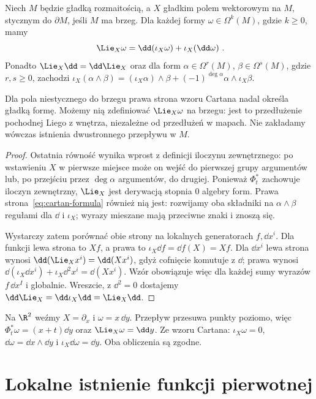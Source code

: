 \begin{twierdzenie}
\label{thm:cartan-formy}
Niech $M$ będzie gładką rozmaitością, a $X$ gładkim polem
wektorowym na $M$, stycznym do $\partial M$, jeśli
$M$ ma brzeg. Dla każdej formy $\omega\in\Omega^k(M)$,
gdzie $k\geq0$, mamy
\begin{equation}\label{eq:cartan-formula}
 {\ \Lie_X\omega=\dd(\iota_X\omega)
       +\iota_X(\dd\omega)\ }.
\end{equation}
Ponadto $\Lie_X\dd=\dd\Lie_X$ oraz dla form
$\alpha\in\Omega^r(M)$, $\beta\in\Omega^s(M)$,
gdzie $r,s\geq0$, zachodzi
$\iota_X(\alpha\wedge\beta)=
(\iota_X\alpha)\wedge\beta
+(-1)^{\deg\alpha}\alpha\wedge\iota_X\beta$.
\end{twierdzenie}
Dla pola niestycznego do brzegu prawa strona wzoru Cartana
nadal określa gładką formę. Możemy nią zdefiniować
$\Lie_X\omega$ na brzegu: jest to przedłużenie pochodnej
Liego z wnętrza, niezależne od przedłużeń w mapach.
Nie zakładamy wówczas istnienia dwustronnego przepływu w $M$.
\begin{proof}
Ostatnia równość wynika wprost z definicji iloczynu
zewnętrznego: po wstawieniu $X$ w pierwsze miejsce
może on wejść do pierwszej grupy argumentów lub,
po przejściu przez $\deg\alpha$ argumentów, do drugiej.
Ponieważ $\Phi_t^*$ zachowuje iloczyn zewnętrzny,
$\Lie_X$ jest derywacją stopnia $0$ algebry form.
Prawa strona~\eqref{eq:cartan-formula} również nią jest:
rozwijamy oba składniki na $\alpha\wedge\beta$
regułami dla $\dd$ i $\iota_X$; wyrazy mieszane mają
przeciwne znaki i znoszą się.

Wystarczy zatem porównać obie strony na lokalnych
generatorach $f,\dd x^i$. Dla funkcji lewa strona to
$Xf$, a prawa to $\iota_X\dd f=\dd f(X)=Xf$.
Dla $\dd x^i$ lewa strona wynosi
$\dd(\Lie_Xx^i)=\dd(Xx^i)$, gdyż cofnięcie
komutuje z $\dd$; prawa wynosi
$\dd(\iota_X\dd x^i)+\iota_X\dd^2x^i
=\dd(Xx^i)$. Wzór obowiązuje więc dla
każdej sumy wyrazów $f\,\dd x^I$ i globalnie.
Wreszcie, z $\dd^2=0$ dostajemy
$\dd\Lie_X=\dd\iota_X\dd
=\Lie_X\dd$.
\end{proof}

\begin{przyklad}
Na $\R^2$ weźmy $X=\partial_x$ i $\omega=x\,\dd y$.
Przepływ przesuwa punkty poziomo, więc
$\Phi_t^*\omega=(x+t)\dd y$ oraz
$\Lie_X\omega=\dd y$. Ze wzoru Cartana:
$\iota_X\omega=0$, $\dd\omega=\dd x\wedge\dd y$
i $\iota_X\dd\omega=\dd y$. Oba obliczenia są zgodne.
\end{przyklad}
\section{Lokalne istnienie funkcji pierwotnej}
\label{sec:formy-poincare}

